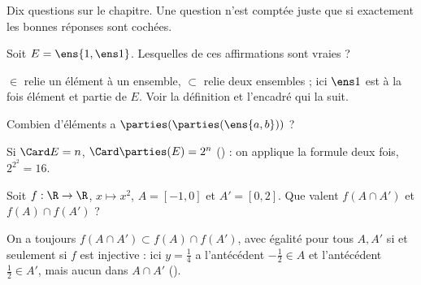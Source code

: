 \begin{qcm}
Dix questions sur le chapitre. Une question n'est comptée juste que si exactement les bonnes réponses sont cochées.
\begin{question}[plusieurs]
Soit $E=\ens{1,\ens1}$. Lesquelles de ces affirmations sont vraies ?
\begin{explication}
$\in$ relie un élément à un ensemble, $\subset$ relie deux ensembles ; ici $\ens1$ est à la fois élément et partie de $E$. Voir la définition  et l'encadré qui la suit.
\end{explication}
\end{question}
\begin{question}
Combien d'éléments a $\parties(\parties(\ens{a,b}))$ ?
\begin{explication}
Si $\Card E=n$, $\Card\parties(E)=2^n$ () : on applique la formule deux fois, $2^{2^2}=16$.
\end{explication}
\end{question}
\begin{question}
Soit $f:\R\to\R$, $x\mapsto x^2$, $A=[-1,0]$ et $A'=[0,2]$. Que valent $f(A\cap A')$ et $f(A)\cap f(A')$ ?
\begin{explication}
On a toujours $f(A\cap A')\subset f(A)\cap f(A')$, avec égalité pour tous $A,A'$ si et seulement si $f$ est injective : ici $y=\frac14$ a l'antécédent $-\frac12\in A$ et l'antécédent $\frac12\in A'$, mais aucun dans $A\cap A'$ ().

\end{explication}
\end{question}
\end{qcm}
